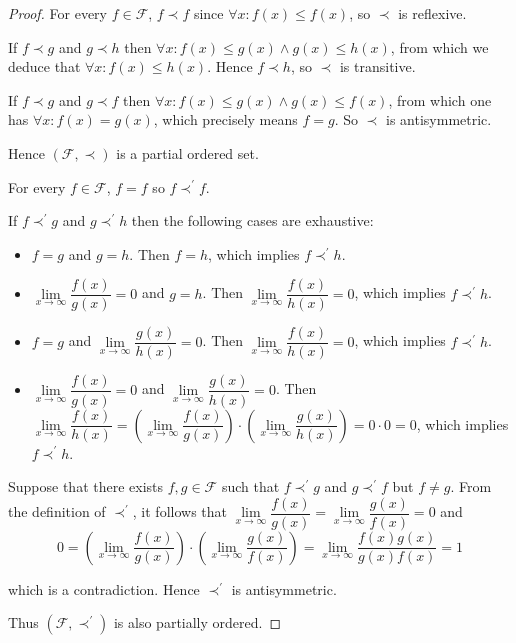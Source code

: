 \begin{proof}
	For every \( f \in \mathscr{F} \), \( f \prec f \) since \( \forall x: f(x) \le f(x) \), so \( \prec \) is reflexive.

	If \( f \prec g \) and \( g \prec h \) then \( \forall x: f(x) \le g(x) \land g(x) \le h(x) \), from which we deduce that \( \forall x: f(x) \le h(x) \). Hence \( f \prec h \), so \( \prec \) is transitive.

	If \( f \prec g \) and \( g \prec f \) then \( \forall x: f(x) \le g(x) \land g(x) \le f(x) \), from which one has \( \forall x: f(x) = g(x) \), which precisely means \( f = g \). So \( \prec \) is antisymmetric.

	Hence \( (\mathscr{F}, \prec) \) is a partial ordered set.

	\bigskip

	For every \( f \in \mathscr{F} \), \( f = f \) so \( f \prec^{\prime} f \).

	If \( f \prec^{\prime} g \) and \( g \prec^{\prime} h \) then the following cases are exhaustive:
	\begin{itemize}
		\item \( f = g \) and \( g = h \). Then \( f = h \), which implies \( f \prec^{\prime} h \).
		\item \( \lim\limits_{x\to\infty} \dfrac{f(x)}{g(x)} = 0 \) and \( g = h \). Then \( \lim\limits_{x\to\infty} \dfrac{f(x)}{h(x)} = 0 \), which implies \( f \prec^{\prime} h \).
		\item \( f = g \) and \( \lim\limits_{x\to\infty} \dfrac{g(x)}{h(x)} = 0 \). Then \( \lim\limits_{x\to\infty } \dfrac{f(x)}{h(x)} = 0 \), which implies \( f \prec^{\prime} h \).
		\item \( \lim\limits_{x\to\infty} \dfrac{f(x)}{g(x)} = 0 \) and \( \lim\limits_{x\to\infty} \dfrac{g(x)}{h(x)} = 0 \). Then \( \lim\limits_{x\to\infty} \dfrac{f(x)}{h(x)} = \left(\lim\limits_{x\to\infty} \dfrac{f(x)}{g(x)}\right)\cdot \left(\lim\limits_{x\to\infty} \dfrac{g(x)}{h(x)}\right) = 0 \cdot 0 = 0 \), which implies \( f \prec^{\prime} h \).
	\end{itemize}

	Suppose that there exists \( f, g \in \mathscr{F} \) such that \( f \prec^{\prime} g \) and \( g \prec^{\prime} f \) but \( f \ne g \). From the definition of \( \prec^{\prime} \), it follows that \( \lim\limits_{x\to\infty} \dfrac{f(x)}{g(x)} = \lim\limits_{x\to\infty} \dfrac{g(x)}{f(x)} = 0 \) and
	\[
		0 = \left(\lim\limits_{x\to\infty} \dfrac{f(x)}{g(x)}\right)\cdot \left(\lim\limits_{x\to\infty} \dfrac{g(x)}{f(x)}\right) = \lim\limits_{x\to\infty} \dfrac{f(x)g(x)}{g(x)f(x)} = 1
	\]

	which is a contradiction. Hence \( \prec^{\prime} \) is antisymmetric.

	Thus \( (\mathscr{F}, \prec^{\prime}) \) is also partially ordered.
\end{proof}

